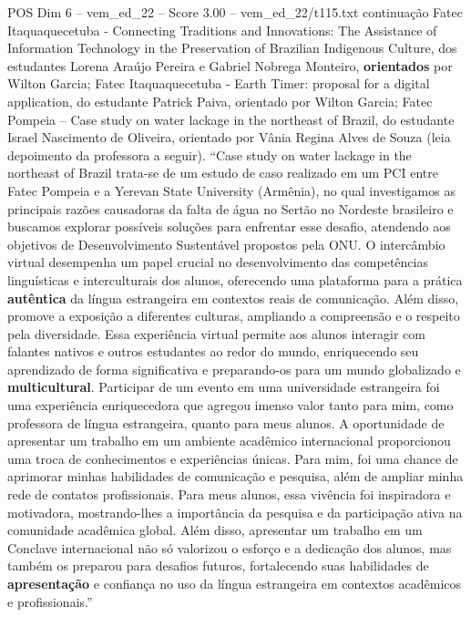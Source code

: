 \begin{textsample}{POS Dim 6 – vem\_ed\_22 – Score 3.00 – vem\_ed\_22/t115.txt}  \label{ex:f6_pos_047}
continuação Fatec Itaquaquecetuba - Connecting Traditions and Innovations: The Assistance of Information Technology in the Preservation of Brazilian Indigenous Culture, dos estudantes Lorena Araújo Pereira e Gabriel Nobrega Monteiro, \textbf{orientados} por Wilton Garcia; Fatec Itaquaquecetuba - Earth Timer: proposal for a digital application, do estudante Patrick Paiva, orientado por Wilton Garcia; Fatec Pompeia – Case study on water lackage in the northeast of Brazil, do estudante Israel Nascimento de Oliveira, orientado por Vânia Regina Alves de Souza (leia depoimento da professora a seguir). “Case study on water lackage in the northeast of Brazil trata-se de um estudo de caso realizado em um PCI entre Fatec Pompeia e a Yerevan State University (Armênia), no qual investigamos as principais razões causadoras da falta de água no Sertão no Nordeste brasileiro e buscamos explorar possíveis soluções para enfrentar esse desafio, atendendo aos objetivos de Desenvolvimento Sustentável propostos pela ONU.
O intercâmbio virtual desempenha um papel crucial no desenvolvimento das competências linguísticas e interculturais dos alunos, oferecendo uma plataforma para a prática \textbf{autêntica} da língua estrangeira em contextos reais de comunicação.
Além disso, promove a exposição a diferentes culturas, ampliando a compreensão e o respeito pela diversidade.
Essa experiência virtual permite aos alunos interagir com falantes nativos e outros estudantes ao redor do mundo, enriquecendo seu aprendizado de forma significativa e preparando-os para um mundo globalizado e \textbf{multicultural}.
Participar de um evento em uma universidade estrangeira foi uma experiência enriquecedora que agregou imenso valor tanto para mim, como professora de língua estrangeira, quanto para meus alunos.
A oportunidade de apresentar um trabalho em um ambiente acadêmico internacional proporcionou uma troca de conhecimentos e experiências únicas.
Para mim, foi uma chance de aprimorar minhas habilidades de comunicação e pesquisa, além de ampliar minha rede de contatos profissionais.
Para meus alunos, essa vivência foi inspiradora e motivadora, mostrando-lhes a importância da pesquisa e da participação ativa na comunidade acadêmica global.
Além disso, apresentar um trabalho em um Conclave internacional não só valorizou o esforço e a dedicação dos alunos, mas também os preparou para desafios futuros, fortalecendo suas habilidades de \textbf{apresentação} e confiança no uso da língua estrangeira em contextos acadêmicos e profissionais.”

\end{textsample}
